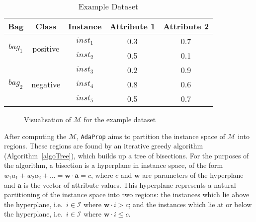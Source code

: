 \documentclass[a4paper,12pt]{article} %
\newcommand{\AdaProp}{\texttt{AdaProp}\xspace}
\newcommand{\mcl}[1]{\mathcal{#1}}
\newcommand{\vect}[1]{\boldsymbol{#1}}
\begin{document}
\begin{table}
\begin{center}
\begin{tabular}{ccccc}
    \toprule
    Bag & Class & Instance & Attribute 1 & Attribute 2 \\
    \midrule
    \multirow{2}{*}{$bag_1$} & \multirow{2}{*}{positive} & $inst_1$ & 0.3 & 0.7 \\
    &  & $inst_2$ & 0.5 & 0.1 \\
    \cmidrule(r){1-5}
    \multirow{3}{*}{$bag_2$} & \multirow{3}{*}{negative} & $inst_3$ & 0.2 & 0.9 \\
    & & $inst_4$ & 0.8 & 0.6 \\
    & & $inst_5$ & 0.5 & 0.7 \\
    \bottomrule
    
\end{tabular}
\end{center}
%
\caption{Example Dataset}
\label{tEgData}
\end{table}

\begin{figure}
\begin{center}
\end{center}
\caption{Visualisation of $\mcl{M}$ for the example dataset}
\label{visM}
\end{figure}

After computing the $\mcl{M}$, 
    \AdaProp aims to partition the instance space of $\mcl{M}$ into regions.
These regions are found by an iterative greedy algorithm (Algorithm~\ref{algoTree}), 
    which builds up a tree of bisections.
For the purposes of the algorithm, 
    a bisection is a hyperplane in instance space, 
    of the form $w_1a_1 + w_2a_2 + \ldots = \vect{w} \cdot \vect{a} = c$,
    where $c$ and $\vect{w}$ are parameters of the hyperplane and 
    $\vect{a}$ is the vector of attribute values.
This hyperplane represents a natural partitioning of the instance space
    into two regions:
        the instances which lie above the hyperplane, 
            i.e.\ $i \in \mcl{I}$ where $\vect{w} \cdot{i} > c$; and
        the instances which lie at or below the hyperplane,
            i.e.\ $i \in \mcl{I}$ where $\vect{w} \cdot{i} \leq c$.
    
\end{document}
